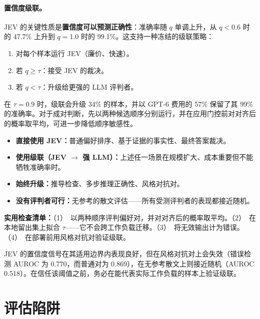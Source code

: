 \paragraph{置信度级联。}
JEV 的关键性质是\textbf{置信度可以预测正确性}：准确率随 $q$ 单调上升，从 $q < 0.6$ 时的 47.7\% 上升到 $q = 1.0$ 时的 99.1\%。这支持一种冻结的级联策略：

\begin{enumerate}
  \item 对每个样本运行 JEV（廉价、快速）。
  \item 若 $q \geq \tau$：接受 JEV 的裁决。
  \item 若 $q < \tau$：升级给更强的 LLM 评判者。
\end{enumerate}

在 $\tau = 0.9$ 时，级联会升级 34\% 的样本，并以 GPT-6 费用的 57\% 保留了其 99\% 的准确率。对于成对判断，先以两种候选顺序分别运行，并在应用门控前对对齐后的概率取平均，可进一步降低顺序敏感性。

\begin{keybox}
\begin{itemize}
  \item \textbf{直接使用 JEV：}普通偏好排序、基于证据的事实性、最终答案裁决。
  \item \textbf{使用级联（JEV $\to$ 强 LLM）：}上述任一场景在规模扩大、成本重要但不能牺牲准确率时。
  \item \textbf{始终升级：}推导检查、多步推理正确性、风格对抗对。
  \item \textbf{没有评判者可行：}无参考的散文评估——所有受测评判者的表现都接近随机。
\end{itemize}
\textbf{实用检查清单：}（1）~以两种顺序评判偏好对，并对对齐后的概率取平均。（2）~在本地留出集上拟合 $\tau$——它不会跨工作负载迁移。（3）~将无效输出计为错误。（4）~在部署前用风格对抗对验证级联。
\end{keybox}

\begin{warningbox}[置信度不是证书]
JEV 的置信度信号在其适用边界内表现良好，但在风格对抗对上会失效（错误检测 AUROC 为 0.770，而普通对为 0.869），在无参考散文上则接近随机（AUROC 0.518）。在信任该阈值之前，务必在能代表实际工作负载的样本上验证级联。
\end{warningbox}

\section{评估陷阱}
\label{subsec:eval-pitfalls}

